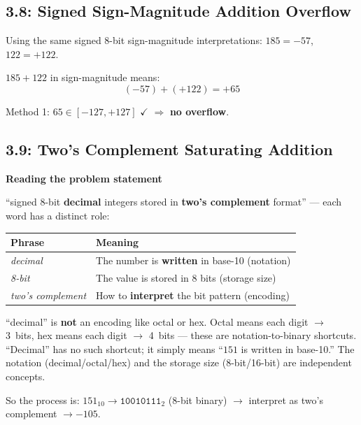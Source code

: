 \subsection*{3.8: Signed Sign-Magnitude Addition Overflow}
\hypertarget{sol-3.8}{}

Using the same signed 8-bit sign-magnitude interpretations:
$185 = -57$, $122 = +122$.

$185 + 122$ in sign-magnitude means:
\[ (-57) + (+122) = +65 \]

Method 1: $65 \in [-127, +127]$ $\checkmark$ $\Rightarrow$ \textbf{no overflow}.

\subsection*{3.9: Two's Complement Saturating Addition}
\hypertarget{sol-3.9}{}

\begin{flushright}
\begin{minipage}{0.92\linewidth}
\scriptsize
\textbf{Reading the problem statement}\par\smallskip
``signed 8-bit \textbf{decimal} integers stored in \textbf{two's complement} format''
--- each word has a distinct role:

\smallskip
\begin{tabular}{@{}l l@{}}
\toprule
Phrase & Meaning \\
\midrule
\textit{decimal} & The number is \textbf{written} in base-10 (notation) \\
\textit{8-bit} & The value is stored in 8 bits (storage size) \\
\textit{two's complement} & How to \textbf{interpret} the bit pattern (encoding) \\
\bottomrule
\end{tabular}

\smallskip
``decimal'' is \textbf{not} an encoding like octal or hex.
Octal means each digit $\to$ 3~bits, hex means each digit $\to$ 4~bits
--- these are notation-to-binary shortcuts.
``Decimal'' has no such shortcut; it simply means
``$151$ is written in base-10.''
The notation (decimal/octal/hex) and the storage size (8-bit/16-bit)
are independent concepts.

\smallskip
So the process is:
$151_{10} \to \texttt{10010111}_2$ (8-bit binary) $\to$
interpret as two's complement $\to -105$.
\end{minipage}
\end{flushright}

